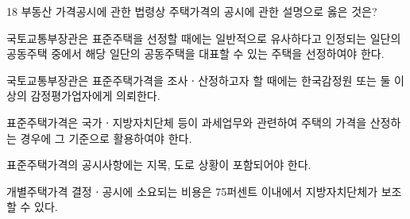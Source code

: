 \begin{question}{18}
부동산 가격공시에 관한 법령상 주택가격의 공시에 관한 설명으로 옳은 것은?
\begin{choices}
  \item 국토교통부장관은 표준주택을 선정할 때에는 일반적으로 유사하다고 인정되는 일단의 공동주택 중에서 해당 일단의 공동주택을 대표할 수 있는 주택을 선정하여야 한다.
  \item 국토교통부장관은 표준주택가격을 조사ㆍ산정하고자 할 때에는 한국감정원 또는 둘 이상의 감정평가업자에게 의뢰한다.
  \item 표준주택가격은 국가ㆍ지방자치단체 등이 과세업무와 관련하여 주택의 가격을 산정하는 경우에 그 기준으로 활용하여야 한다.
  \item 표준주택가격의 공시사항에는 지목, 도로 상황이 포함되어야 한다.
  \item 개별주택가격 결정ㆍ공시에 소요되는 비용은 75퍼센트 이내에서 지방자치단체가 보조할 수 있다.
\end{choices}
\end{question}
